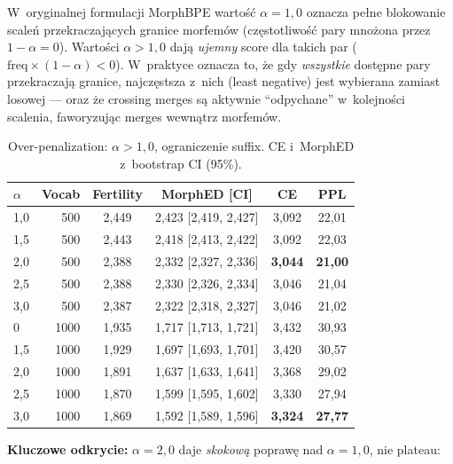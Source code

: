 W~oryginalnej formulacji MorphBPE wartość $\alpha = 1{,}0$ oznacza
pełne blokowanie scaleń przekraczających granice morfemów
(częstotliwość pary mnożona przez $1 - \alpha = 0$). Wartości
$\alpha > 1{,}0$ dają \emph{ujemny} score dla takich par
($\mathrm{freq} \times (1 - \alpha) < 0$). W~praktyce oznacza to,
że gdy \emph{wszystkie} dostępne pary przekraczają granice,
najczęstsza z~nich (least negative) jest wybierana zamiast losowej
--- oraz że crossing merges są aktywnie ``odpychane'' w~kolejności
scalenia, faworyzując merges wewnątrz morfemów.

\begin{table}[h]
  \centering
  \caption{Over-penalization: $\alpha > 1{,}0$, ograniczenie suffix.
  CE i~MorphED z~bootstrap CI (95\%).}
  \label{tab:extended}
  \small
  \begin{tabular}{lrcccc}
    \toprule
    $\alpha$ & Vocab & Fertility & MorphED [CI] & CE & PPL \\
    \midrule
    1{,}0  & 500  & 2{,}449 & 2{,}423 [2{,}419, 2{,}427] & 3{,}092 & 22{,}01 \\
    1{,}5  & 500  & 2{,}443 & 2{,}418 [2{,}413, 2{,}422] & 3{,}092 & 22{,}03 \\
    \rowcolor{slayergreen!20}
    2{,}0  & 500  & 2{,}388 & 2{,}332 [2{,}327, 2{,}336] & \textbf{3{,}044} & \textbf{21{,}00} \\
    2{,}5  & 500  & 2{,}388 & 2{,}330 [2{,}326, 2{,}334] & 3{,}046 & 21{,}04 \\
    3{,}0  & 500  & 2{,}387 & 2{,}322 [2{,}318, 2{,}327] & 3{,}046 & 21{,}02 \\
    \addlinespace
    1{,}0  & 1000 & 1{,}935 & 1{,}717 [1{,}713, 1{,}721] & 3{,}432 & 30{,}93 \\
    1{,}5  & 1000 & 1{,}929 & 1{,}697 [1{,}693, 1{,}701] & 3{,}420 & 30{,}57 \\
    2{,}0  & 1000 & 1{,}891 & 1{,}637 [1{,}633, 1{,}641] & 3{,}368 & 29{,}02 \\
    2{,}5  & 1000 & 1{,}870 & 1{,}599 [1{,}595, 1{,}602] & 3{,}330 & 27{,}94 \\
    \rowcolor{slayergreen!20}
    3{,}0  & 1000 & 1{,}869 & 1{,}592 [1{,}589, 1{,}596] & \textbf{3{,}324} & \textbf{27{,}77} \\
    \bottomrule
  \end{tabular}
\end{table}

\textbf{Kluczowe odkrycie:} $\alpha = 2{,}0$ daje \emph{skokową}
poprawę nad $\alpha = 1{,}0$, nie plateau:

